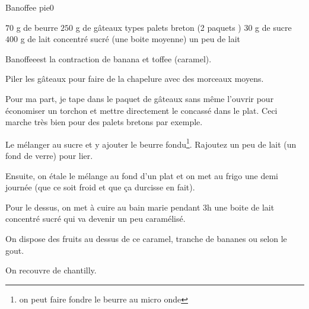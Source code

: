 \begin{recette}{Banoffee pie}{0}{}{}
\begin{ingredients}
\ingredient $70$ g de beurre
\ingredient $250$ g de gâteaux types palets breton (2 paquets )
\ingredient $30$ g de sucre
\ingredient $400$ g de lait concentré sucré (une boite moyenne)
\ingredient un peu de lait
\end{ingredients}

\begin{remarque}
\og Banoffee\fg est la contraction de banana et toffee (caramel).
\end{remarque}

\begin{preparation}
\etape Piler les gâteaux pour faire de la chapelure avec des morceaux moyens.

\begin{remarque}
Pour ma part, je tape dans le paquet de gâteaux sans même l'ouvrir pour économiser un torchon et mettre directement le concassé dans le plat. Ceci marche très bien pour des palets bretons par exemple.
\end{remarque}

\etape Le mélanger au sucre et y ajouter le beurre fondu\footnote{on peut faire fondre le beurre au micro onde}. Rajoutez un peu de lait (un fond de verre) pour lier.

\etape Ensuite, on étale le mélange au fond d'un plat et on met au frigo une demi journée (que ce soit froid et que ça durcisse en fait).

\etape Pour le dessus, on met à cuire au bain marie pendant 3h une boite de lait concentré sucré qui va devenir un peu caramélisé.

\etape On dispose des fruits au dessus de ce caramel, tranche de bananes ou selon le gout.

\etape On recouvre de chantilly.
\end{preparation}

\end{recette}

